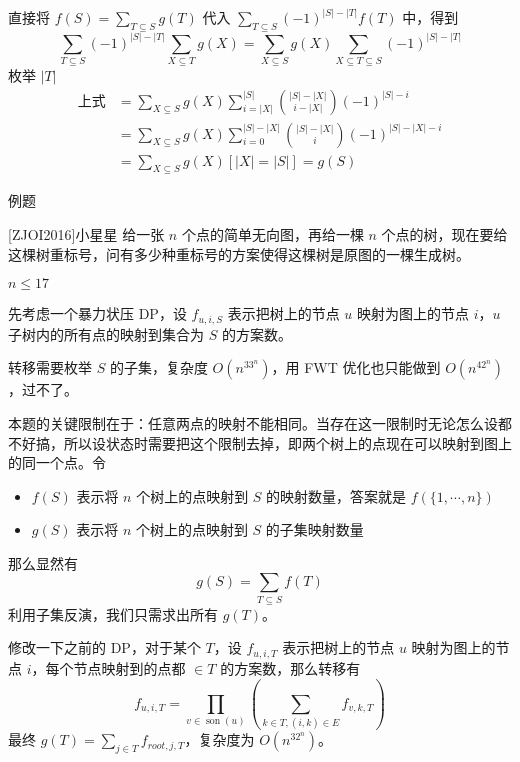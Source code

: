 \documentclass[UTF8]{beamer}
\begin{document}
    \begin{frame}
        直接将 $f(S)=\sum_{T \subseteq S} g(T)$ 代入 $\sum_{T \subseteq S}(-1)^{|S|-|T|} f(T)$ 中，得到
        $$
        \sum_{T \subseteq S}(-1)^{|S|-|T|}\sum_{X\subseteq T}g(X)=\sum_{X\subseteq S}g(X)\sum_{X\subseteq T\subseteq S}(-1)^{|S|-|T|}
        $$
        枚举 $|T|$
        $$
        \begin{aligned}
            \text{上式}&=\sum_{X\subseteq S}g(X)\sum_{i=|X|}^{|S|}\binom{|S|-|X|}{i-|X|}(-1)^{|S|-i}\\
            &=\sum_{X\subseteq S}g(X)\sum_{i=0}^{|S|-|X|}\binom{|S|-|X|}{i}(-1)^{|S|-|X|-i}\\
            &=\sum_{X\subseteq S}g(X)[|X|=|S|]=g(S)
        \end{aligned}
        $$
    \end{frame}

    \begin{frame}{例题}
        \begin{block}{[ZJOI2016]小星星}
            给一张 $n$ 个点的简单无向图，再给一棵 $n$ 个点的树，现在要给这棵树重标号，问有多少种重标号的方案使得这棵树是原图的一棵生成树。

            $n\le 17$
        \end{block}
        \pause

        先考虑一个暴力状压 DP，设 $f_{u,i,S}$ 表示把树上的节点 $u$ 映射为图上的节点 $i$，$u$ 子树内的所有点的映射到集合为 $S$ 的方案数。

        转移需要枚举 $S$ 的子集，复杂度 $O(n^33^n)$，用 FWT 优化也只能做到 $O(n^42^n)$，过不了。

    \end{frame}

    \begin{frame}
        本题的关键限制在于：任意两点的映射不能相同。当存在这一限制时无论怎么设都不好搞，所以设状态时需要把这个限制去掉，即两个树上的点现在可以映射到图上的同一个点。令
        \begin{itemize}
            \item $f(S)$ 表示将 $n$ 个树上的点映射到 $S$ 的映射数量，答案就是 $f(\{1,\cdots,n\})$
            \item $g(S)$ 表示将 $n$ 个树上的点映射到 $S$ 的子集映射数量
        \end{itemize}
        那么显然有
        $$
        g(S)=\sum_{T\subseteq S}f(T)
        $$
        利用子集反演，我们只需求出所有 $g(T)$。
        \pause
        
        修改一下之前的 DP，对于某个 $T$，设 $f_{u,i,T}$ 表示把树上的节点 $u$ 映射为图上的节点 $i$，每个节点映射到的点都 $\in T$ 的方案数，那么转移有
        $$
        f_{u,i,T} = \prod_{v\in \operatorname{son}(u)}\left(\sum_{k\in T,(i,k)\in E} f_{v,k,T}\right)
        $$
        最终 $g(T) = \sum_{j\in T}f_{root,j,T}$，复杂度为 $O(n^32^n)$。
    \end{frame}
\end{document}

